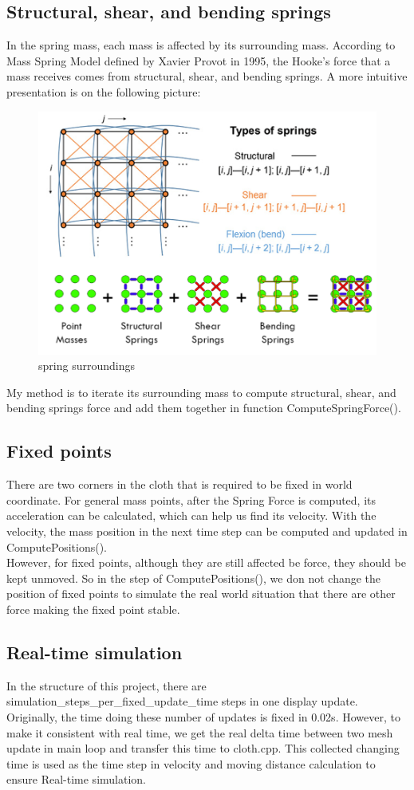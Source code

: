 \documentclass[acmtog]{acmart}
\begin{document}
\subsection{Structural, shear, and bending springs}
In the spring mass, each mass is affected by its surrounding mass. According to Mass Spring Model defined by Xavier Provot in 1995, the Hooke's force that a mass receives comes from structural, shear, and bending springs. A more intuitive presentation is on the following picture:\\
\begin{figure}[h]
	\centering
	\includegraphics[width=0.7\linewidth]{springsurround.png}
	\caption{spring surroundings}
	\label{fig:Hooke's Force around}
\end{figure}
\newline
My method is to iterate its surrounding mass to compute structural, shear, and bending springs force and add them together in function ComputeSpringForce().
\subsection{Fixed points}
There are two corners in the cloth that is required to be fixed in world coordinate. For general mass points, after the Spring Force is computed, its acceleration can be calculated, which can help us find its velocity. With the velocity, the mass position in the next time step can be computed and updated in ComputePositions().\\
However, for fixed points, although they are still affected be force, they should be kept unmoved. So in the step of ComputePositions(), we don not change the position of fixed points to simulate the real world situation that there are other force making the fixed point stable.
\subsection{Real-time simulation}
In the structure of this project, there are simulation\_steps\_per\_fixed\_update\_time steps in one display update. Originally, the time doing these number of updates is fixed in 0.02s. However, to make it consistent with real time, we get the real delta time between two mesh update in main loop and transfer this time to cloth.cpp. This collected changing time is used as the time step in velocity and moving distance calculation to ensure Real-time simulation.
\end{document}
